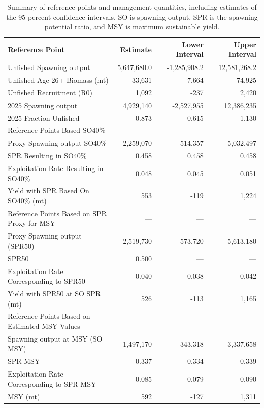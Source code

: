 \documentclass[
]{scrartcl}
\begin{document}
\begin{longtable}{lrrr}

\caption{\label{tbl-ref-points-es}Summary of reference points and
management quantities, including estimates of the 95 percent confidence
intervals. SO is spawning output, SPR is the spawning potential ratio,
and MSY is maximum sustainable yield.}

\tabularnewline

\toprule
Reference Point & Estimate & Lower Interval & Upper Interval \\ 
\midrule\addlinespace[2.5pt]
Unfished Spawning output & 5,647,680.0 & -1,285,908.2 & 12,581,268.2 \\ 
Unfished Age 26+ Biomass (mt) & 33,631 & -7,664 & 74,925 \\ 
Unfished Recruitment (R0) & 1,092 & -237 & 2,420 \\ 
2025 Spawning output & 4,929,140 & -2,527,955 & 12,386,235 \\ 
2025 Fraction Unfished & 0.873 & 0.615 & 1.130 \\ 
Reference Points Based SO40\% & — & — & — \\ 
Proxy Spawning output SO40\% & 2,259,070 & -514,357 & 5,032,497 \\ 
SPR Resulting in SO40\% & 0.458 & 0.458 & 0.458 \\ 
Exploitation Rate Resulting in SO40\% & 0.048 & 0.045 & 0.051 \\ 
Yield with SPR Based On SO40\% (mt) & 553 & -119 & 1,224 \\ 
Reference Points Based on SPR Proxy for MSY & — & — & — \\ 
Proxy Spawning output (SPR50) & 2,519,730 & -573,720 & 5,613,180 \\ 
SPR50 & 0.500 & — & — \\ 
Exploitation Rate Corresponding to SPR50 & 0.040 & 0.038 & 0.042 \\ 
Yield with SPR50 at SO SPR (mt) & 526 & -113 & 1,165 \\ 
Reference Points Based on Estimated MSY Values & — & — & — \\ 
Spawning output at MSY (SO MSY) & 1,497,170 & -343,318 & 3,337,658 \\ 
SPR MSY & 0.337 & 0.334 & 0.339 \\ 
Exploitation Rate Corresponding to SPR MSY & 0.085 & 0.079 & 0.090 \\ 
MSY (mt) & 592 & -127 & 1,311 \\ 
\bottomrule

\end{longtable}
\end{document}
